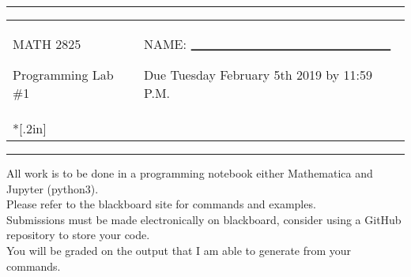 \documentclass[11pt]{article}
\begin{document}
\newcommand{\dsp}{\displaystyle}
\newcommand{\ihat}{{\bf{i}}}
\newcommand{\jhat}{{\bf{j}}}
\newcommand{\khat}{{\bf{k}}}
\newcommand{\Fhat}{{\bf{F}}}

\thispagestyle{empty}

\noindent
\sffamily
\begin{center}
\rule{7.5in}{2pt}

\vspace{.2in}

\begin{tabular}{p{4in}p{3.5in}}
MATH 2825

\vspace{.2in}

Programming Lab \#1
& 
NAME:  $_{\rule{2.5in}{1pt}}$

\vspace{.2in}

Due Tuesday February 5th 2019 by 11:59 P.M.
\\*[.2in]
\end{tabular}
\rule{7.5in}{2pt}

\vspace{.1in}
All work is to be done in a programming notebook either Mathematica and Jupyter (python3).  \\
 Please refer to the blackboard site for commands and examples. \\
 Submissions must be made electronically on blackboard, consider using a GitHub repository to store your code. \\
   You will be graded on the output that I am able to generate from your commands.
\end{center}
\end{document}
